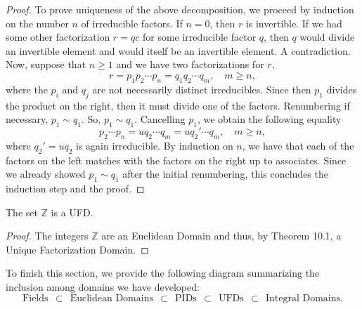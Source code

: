\documentclass[11pt,a4paper]{article}
\begin{document}
\begin{proof}
    To prove uniqueness of the above decomposition, we proceed by induction on the number $n$ of irreducible factors. If $n = 0$, then $r$ is invertible. If we had some other factorization $r = qc$ for some irreducible factor $q$, then $q$ would divide an invertible element and would itself be an invertible element. A contradiction. Now, suppose that $n \geq 1$ and we have two factorizations for $r$,
    \[
    r = p_1 p_2 \cdots p_n = q_1 q_2 \cdots q_m, \quad m \geq n,
    \]
    where the $p_i$ and $q_j$ are not necessarily distinct irreducibles. Since then $p_1$ divides the product on the right, then it must divide one of the factors. Renumbering if necessary, $p_1 \sim q_1$. So, $p_1 \sim q_1$. Cancelling $p_1$, we obtain the following equality
    \[
    p_2 \cdots p_n = uq_2 \cdots q_m = uq_2' \cdots q_m, \quad m \geq n,
    \]
    where $q_2' = uq_2$ is again irreducible. By induction on $n$, we have that each of the factors on the left matches with the factors on the right up to associates. Since we already showed $p_1 \sim q_1$ after the initial renumbering, this concludes the induction step and the proof.
    \end{proof}
    
    \begin{cor}
    The set $\mathbb{Z}$ is a UFD.
    \end{cor}
    
    \begin{proof}
    The integers $\mathbb{Z}$ are an Euclidean Domain and thus, by Theorem 10.1, a Unique Factorization Domain.
    \end{proof}
    
    To finish this section, we provide the following diagram summarizing the inclusion among domains we have developed:
    \[
    \text{Fields}\;\, \subset\;\, \text{Euclidean Domains} \;\,\subset\;\, \text{PIDs} \;\,\subset\;\, \text{UFDs} \;\,\subset\;\, \text{Integral Domains}.
    \]
    
\vfill{}
\end{document}
